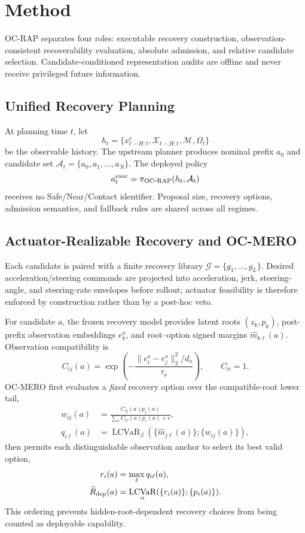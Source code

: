 \documentclass[conference]{IEEEtran}
\DeclareMathOperator{\LCVaR}{LCVaR}
\newcommand{\cA}{\mathcal{A}}
\newcommand{\cG}{\mathcal{G}}
\begin{document}
\section{Method}
\label{sec:method}

OC-RAP separates four roles: executable recovery construction, observation-consistent recoverability evaluation, absolute admission, and relative candidate selection. Candidate-conditioned representation audits are offline and never receive privileged future information.

\subsection{Unified Recovery Planning}
At planning time $t$, let
\begin{equation}
 h_t=\{x^e_{t-H:t},\mathcal X_{t-H:t},\mathcal M,\Omega_t\}
\end{equation}
be the observable history. The upstream planner produces nominal prefix $a_0$ and candidate set $\cA_t=\{a_0,a_1,\ldots,a_N\}$. The deployed policy
\begin{equation}
 a_t^{\rm exec}=\pi_{\rm OC\mbox{-}RAP}(h_t,\cA_t)
\end{equation}
receives no Safe/Near/Contact identifier. Proposal size, recovery options, admission semantics, and fallback rules are shared across all regimes.

\subsection{Actuator-Realizable Recovery and OC-MERO}
Each candidate is paired with a finite recovery library $\cG=\{g_1,\ldots,g_L\}$. Desired acceleration/steering commands are projected into acceleration, jerk, steering-angle, and steering-rate envelopes before rollout; actuator feasibility is therefore enforced by construction rather than by a post-hoc veto.

For candidate $a$, the frozen recovery model provides latent roots $(z_k,p_k)$, post-prefix observation embeddings $e_k^o$, and root--option signed margins $\hat m_{k\ell}(a)$. Observation compatibility is
\begin{equation}
 C_{ij}(a)=\exp\!\left(-\frac{\|e_i^o-e_j^o\|_2^2/d_o}{\tau_o}\right),\qquad C_{ii}=1.
\end{equation}
OC-MERO first evaluates a \emph{fixed} recovery option over the compatible-root lower tail,
\begin{align}
 w_{ij}(a)&=\frac{C_{ij}(a)p_j(a)}{\sum_r C_{ir}(a)p_r(a)+\epsilon},\\
 q_{i\ell}(a)&=\LCVaR_{\beta}(\{\hat m_{j\ell}(a)\};\{w_{ij}(a)\}),
\end{align}
then permits each distinguishable observation anchor to select its best valid option,
\begin{align}
 r_i(a)&=\max_{\ell}q_{i\ell}(a),\\
 \widehat R_{\rm dep}(a)&=\LCVaR_{\alpha}(\{r_i(a)\};\{p_i(a)\}).
 \label{eq:rdep_main}
\end{align}
This ordering prevents hidden-root-dependent recovery choices from being counted as deployable capability.
\end{document}
